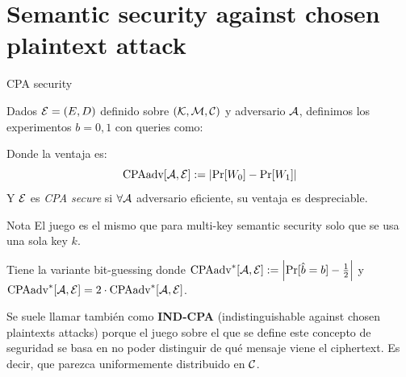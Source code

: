 \section{Semantic security against chosen plaintext attack}
\begin{frame}[allowframebreaks]{CPA security}
  \begin{definition}
    Dados $\mathcal{E} = (E, D)$ definido sobre $(\mathcal{K}, \mathcal{M}, \mathcal{C})$ y adversario $\mathcal{A}$, definimos los 
    experimentos $b = 0,1$ con queries como:

    \begin{centering}
    \end{centering}

    Donde la ventaja es:
    \begin{equation*}
      \text{CPAadv}[\mathcal{A}, \mathcal{E}] := \left|\text{Pr}[W_0] - \text{Pr}[W_1]\right|
    \end{equation*}
    Y $\mathcal{E}$ es \textit{CPA secure} si $\forall \mathcal{A}$ adversario eficiente, su ventaja 
    es despreciable.
  \end{definition}

  \begin{block}{Nota}
    El juego es el mismo que para multi-key semantic security solo que se usa una sola 
    key $k$.

    Tiene la variante bit-guessing donde $\text{CPAadv}^*[\mathcal{A}, \mathcal{E}] := \left|\text{Pr}[\hat{b} = b] - \frac{1}{2}\right|$
    y $\text{CPAadv}^*[\mathcal{A}, \mathcal{E}] = 2 \cdot \text{CPAadv}^*[\mathcal{A}, \mathcal{E}]$.

    Se suele llamar también como \textbf{IND-CPA} (indistinguishable against chosen plaintexts 
    attacks) porque el juego sobre el que se define este concepto de seguridad se basa 
    en no poder distinguir de qué mensaje viene el ciphertext.
    Es decir, que parezca uniformemente distribuido en $\mathcal{C}$.
  \end{block}
\end{frame}

